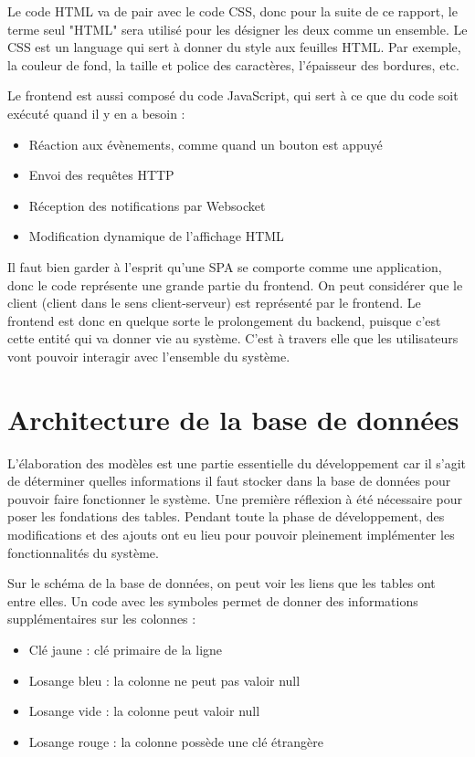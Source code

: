 \documentclass[
    iai, %
    eai, %
]{heig-tb}
\begin{document}
Le code HTML va de pair avec le code CSS, donc pour la suite de ce rapport, le terme seul "HTML" sera utilisé pour les désigner les deux comme un ensemble.
Le CSS est un language qui sert à donner du style aux feuilles HTML. Par exemple, la couleur de fond, la taille et police des caractères, l'épaisseur des bordures, etc.

Le frontend est aussi composé du code JavaScript, qui sert à ce que du code soit exécuté quand il y en a besoin :
\begin{itemize}
  \item Réaction aux évènements, comme quand un bouton est appuyé
  \item Envoi des requêtes HTTP
  \item Réception des notifications par Websocket
  \item Modification dynamique de l'affichage HTML
\end{itemize}
\bigskip

Il faut bien garder à l'esprit qu'une SPA se comporte comme une application, donc le code représente une grande partie du frontend.
On peut considérer que le client (client dans le sens client-serveur) est représenté par le frontend. Le frontend est donc en quelque sorte le prolongement du backend, puisque c'est cette entité qui va donner vie au système. C'est à travers elle que les utilisateurs vont pouvoir interagir avec l'ensemble du système.

\chapter{Architecture de la base de données}
\label{chapter:database}
L'élaboration des modèles est une partie essentielle du développement car il s'agit de déterminer quelles informations il faut stocker dans la base de données pour pouvoir faire fonctionner le système. Une première réflexion à été nécessaire pour poser les fondations des tables. Pendant toute la phase de développement, des modifications et des ajouts ont eu lieu pour pouvoir pleinement implémenter les fonctionnalités du système.
\newpage

Sur le schéma de la base de données, on peut voir les liens que les tables ont entre elles. Un code avec les symboles permet de donner des informations supplémentaires sur les colonnes :
\begin{itemize}
  \item Clé jaune : clé primaire de la ligne
  \item Losange bleu : la colonne ne peut pas valoir null
  \item Losange vide : la colonne peut valoir null
  \item Losange rouge : la colonne possède une clé étrangère
\end{itemize}
\bigskip
\end{document}
